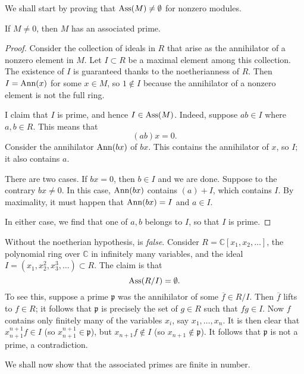 We shall start by proving that $\operatorname{Ass}(M) \neq \emptyset$ for nonzero modules. 
\begin{proposition} \label{assmnonempty} 
If $M \neq 0$, then $M$ has an associated prime.
\end{proposition} 
\begin{proof}  Consider the collection of ideals in $R$ that arise as the
annihilator of a nonzero element in $M$. 
Let $I \subset R$ be a maximal element among this collection.  The existence of $I$ is guaranteed thanks to the noetherianness of
$R$.
Then $I = \operatorname{Ann}(x)$ for some $x \in M$, so  $1 \notin I$ because the annihilator of a nonzero element is not the full
ring.

I claim that
$I$ is prime,  and hence $I \in \operatorname{Ass}(M)$.  
Indeed, suppose $ab \in I$ where $a,b \in R$. This means that
\[ (ab)x = 0.  \]
Consider the annihilator $\operatorname{Ann}(bx)$ of $bx$. This contains the annihilator of $x$, so $I$;
it also contains $a$.

There are two cases. If $bx = 0$, then $ b \in I$ and we are done. Suppose to
the contrary $bx \neq 0$. In this case, $\operatorname{Ann}(bx)$ contains $(a) + I$, which
 contains $I$. By maximality, it must happen that $\operatorname{Ann}(bx) = I$ and $ a \in
 I$. 

 In either case, we find that one of $a,b $ belongs to $I$, so that $I$ is
 prime. 

\end{proof} 

\begin{example}
Without the noetherian hypothesis,  is
\emph{false}. Consider $R = \mathbb{C}[x_1, x_2, \dots]$, the polynomial ring
over $\mathbb{C}$ in infinitely many variables, and the ideal $I = (x_1,
x_2^2, x_3^3, \dots) \subset R$.
The claim is that 
\[ \operatorname{Ass}(R/I ) = \emptyset.  \]
To see this, suppose a prime $\mathfrak{p}$ was the annihilator of some
$\overline{f}\in R/I$.  Then $\overline{f}$ lifts to $f \in R$; it follows
that $\mathfrak{p}$ is precisely the set of $g \in R$ such that $fg \in I$.
Now $f$ contains only finitely many of the variables $x_i$, say $x_1, \dots,
x_n$. It is then clear that $x_{n+1}^{n+1} f \in I$  (so $x_{n+1}^{n+1} \in
\mathfrak{p}$), but $x_{n+1} f \notin I$ (so $x_{n+1} \notin \mathfrak{p}$).
It follows that $\mathfrak{p}$ is not a prime, a contradiction.
\end{example} 

We shall now show that the associated primes are finite in number.

